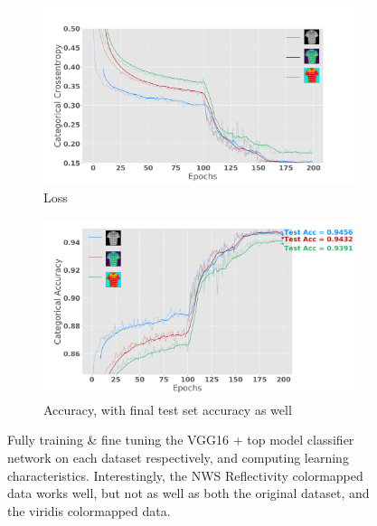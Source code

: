 \begin{figure}[ht]
	\centering
	\begin{subfigure}[b]{\textwidth}
		\includegraphics[width=\textwidth]{./thesis_code/plots/20190425_200epoch_finetuning_mnistfashion_loss.png}
		\caption{Loss}
		\label{fig:classifying_longtraining_finetuning_loss}
	\end{subfigure}
	\begin{subfigure}[b]{\textwidth}
		\includegraphics[width=\textwidth]{./thesis_code/plots/20190425_200epoch_finetuning_mnistfashion.png}
		\caption{Accuracy, with final test set accuracy as well}
		\label{fig:classifying_longtraining_finetuning_acc}
	\end{subfigure}
	\caption{Fully training \& fine tuning the VGG16 + top model classifier network on each dataset respectively, and computing learning characteristics. Interestingly, the NWS Reflectivity colormapped data works well, but not as well as both the original dataset, and the viridis colormapped data.}
	\label{fig:classifying_longtraining_finetuning}
\end{figure}

